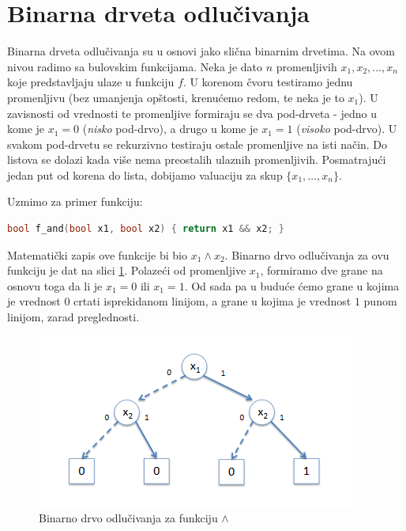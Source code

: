 \section{Binarna drveta odlu\v{c}ivanja}
\label{sec:BinarnaDrvetaOdlucivanja}

Binarna drveta odlu\v{c}ivanja su u osnovi jako sli\v{c}na binarnim drvetima. Na ovom nivou radimo sa bulovskim funkcijama. Neka je dato $n$ promenljivih $x_{1}, x_{2}, \dots , x_{n}$ koje predstavljaju ulaze u funkciju $f$. U korenom \v{c}voru testiramo jednu promenljivu (bez umanjenja op\v{s}tosti, krenu\'c{}emo redom, te neka je to $x_{1}$). U zavisnosti od vrednosti te promenljive formiraju se dva pod-drveta - jedno u kome je $x_{1} = 0$ (\emph{nisko} pod-drvo), a drugo u kome je $x_{1} = 1$ (\emph{visoko} pod-drvo). U svakom pod-drvetu se rekurzivno testiraju ostale promenljive na isti na\v{c}in. Do listova se dolazi kada vi\v{s}e nema preostalih ulaznih promenljivih. Posmatraju\'c{}i jedan put od korena do lista, dobijamo valuaciju za skup $\{x_{1}, \dots , x_{n}\}$.

Uzmimo za primer funkciju:

\begin{lstlisting}[language=C++,escapechar=@]
    bool f_and(bool x1, bool x2) { return x1 && x2; }
\end{lstlisting}

\noindent Matematički zapis ove funkcije bi bio $x_{1} \wedge x_{2}$. Binarno drvo odlu\v{c}ivanja za ovu funkciju je dat na slici \ref{diag:BDAnd}. Polaze\'c{}i od promenljive $x_{1}$, formiramo dve grane na osnovu toga da li je $x_{1} = 0$ ili $x_{1} = 1$. Od sada pa u budu\'c{}e \'c{}emo grane u kojima je vrednost $0$ crtati isprekidanom linijom, a grane u kojima je vrednost $1$ punom linijom, zarad preglednosti.

\begin{figure}[H]
    \centering
    \includegraphics[scale=0.8]{slike/BD_And.PNG}
    \caption{Binarno drvo odlu\v{c}ivanja za funkciju $\wedge$}
    \label{diag:BDAnd}
\end{figure}


